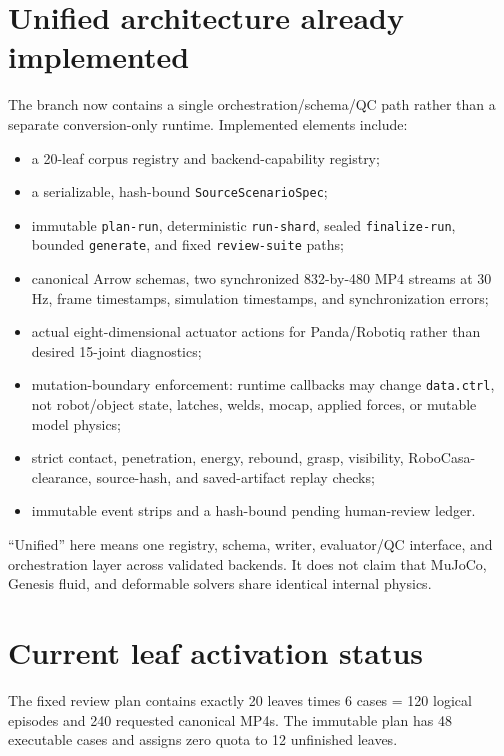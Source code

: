 \documentclass[11pt]{article}
\begin{document}
\section{Unified architecture already implemented}

The branch now contains a single orchestration/schema/QC path rather than a
separate conversion-only runtime.  Implemented elements include:

\begin{itemize}
  \item a 20-leaf corpus registry and backend-capability registry;
  \item a serializable, hash-bound \texttt{SourceScenarioSpec};
  \item immutable \texttt{plan-run}, deterministic \texttt{run-shard}, sealed
        \texttt{finalize-run}, bounded \texttt{generate}, and fixed
        \texttt{review-suite} paths;
  \item canonical Arrow schemas, two synchronized 832-by-480 MP4 streams at
        30 Hz, frame timestamps, simulation timestamps, and synchronization
        errors;
  \item actual eight-dimensional actuator actions for Panda/Robotiq rather
        than desired 15-joint diagnostics;
  \item mutation-boundary enforcement: runtime callbacks may change
        \texttt{data.ctrl}, not robot/object state, latches, welds, mocap,
        applied forces, or mutable model physics;
  \item strict contact, penetration, energy, rebound, grasp, visibility,
        RoboCasa-clearance, source-hash, and saved-artifact replay checks;
  \item immutable event strips and a hash-bound pending human-review ledger.
\end{itemize}

``Unified'' here means one registry, schema, writer, evaluator/QC interface,
and orchestration layer across validated backends.  It does not claim that
MuJoCo, Genesis fluid, and deformable solvers share identical internal
physics.

\section{Current leaf activation status}

The fixed review plan contains exactly 20 leaves times 6 cases = 120 logical
episodes and 240 requested canonical MP4s.  The immutable plan has 48
executable cases and assigns zero quota to 12 unfinished leaves.
\end{document}
